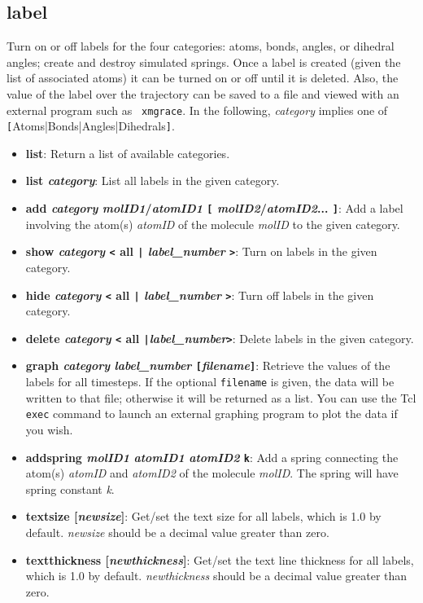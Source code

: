     
  \subsection{label} Turn on or off labels for
the four categories: atoms, bonds, angles, or dihedral angles; create
and destroy simulated springs.  Once a label is created (given the
list of associated atoms) it can be turned on or off until it is
deleted.  Also, the value of the label over the trajectory can be
saved to a file and viewed with an external program such as {\tt
xmgrace}.  In the following, {\it category} implies one of {\tt
[}Atoms|Bonds|Angles|Dihedrals{\tt ]}.

  \begin{itemize}
    \item {\bf  list}: Return a list of available categories.
    \item {\bf  list {\it category}}: List all labels in the given category.
    \item {\bf  add {\it category} {\it molID1}/{\it atomID1} {\tt [}
{\it molID2}/{\it atomID2}... {\tt ]}}: Add a
label involving the atom(s) {\it atomID} of the molecule {\it molID} to the
given category.
    \item {\bf  show {\it category} {\tt <} all {\tt |} {\it label\_number} {\tt >}}: 
Turn on labels in the given category.
    \item {\bf  hide {\it category} {\tt <} all {\tt |} {\it label\_number} {\tt >}}: 
Turn off labels in the given category.
    \item {\bf  delete {\it category} {\tt <} all {\tt |}{\it label\_number}{\tt >}}:
 Delete labels in the given category.
    \item {\bf  graph {\it category} {\it label\_number} {\tt [}{\it filename}{\tt ]}}: 
Retrieve the values of the labels for all timesteps.  If the optional 
{\tt filename} is given, the data will be written to that file; otherwise
it will be returned as a list.  You can use the Tcl {\tt exec} command to
launch an external graphing program to plot the data if you wish.
    \item {\bf  addspring {\it molID1} {\it atomID1}
{\it atomID2} {\tt k}}: Add a
spring connecting the atom(s) {\it atomID\/} and {\it atomID2\/} of the
molecule {\it molID}.  The spring will have spring constant {\it k}.
    \item {\bf  textsize [{\it newsize}]}:
      Get/set the text size for all labels, which is 1.0 by default.
      {\it newsize} should be a decimal value greater than zero.
    \item {\bf  textthickness [{\it newthickness}]}:
      Get/set the text line thickness for all labels, which is 1.0 by default.
      {\it newthickness} should be a decimal value greater than zero.
\end{itemize}

